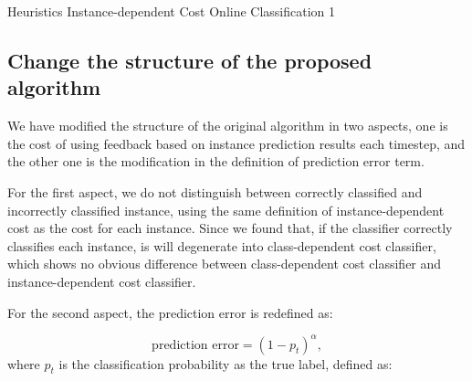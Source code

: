 \documentclass{article}
\begin{document}
\begin{algorithm}
	\caption{Heuristics Instance-dependent Cost Online Classification 1}
\end{algorithm}


\subsection{Change the structure of the proposed algorithm}

We have modified the structure of the original algorithm in two aspects, one is the cost of using feedback based on instance prediction results each timestep, and the other one is the modification in the definition of prediction error term.

For the first aspect, we do not distinguish between correctly classified and incorrectly classified instance, using the same definition of instance-dependent cost as the cost for each instance. Since we found that, if the classifier correctly classifies each instance, is will degenerate into class-dependent cost classifier, which shows no obvious difference between class-dependent cost classifier and instance-dependent cost classifier.


For the second aspect, the prediction error is redefined as: 

\begin{equation}
	\text{prediction error} = (1 - p_t)^\alpha,
\end{equation}
 where $p_t$ is the classification probability as the true label, defined as:
 
\end{document}
